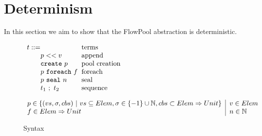 \section{Determinism}

In this section we aim to show that the FlowPool abstraction is deterministic.



\smallrulenames

\begin{figure}[t]


$\ba[t]{l@{\hspace{2mm}}l}
t    ::=                                                           & \mbox{terms}              \\
\gap p << v                                                  & \mbox{append}           \\
\gap \texttt{create}~p                                   & \mbox{pool creation}  \\
\gap p~\texttt{foreach}~f                             & \mbox{foreach}           \\
\gap p~\texttt{seal}~n                                  & \mbox{seal}                \\
\gap t_1~;~t_2                                               & \mbox{sequence}        \\
\ea$

$\ba{l@{\hspace{2mm}}|@{\hspace{2mm}}l@{\hspace{2mm}}l}
p \in \set{(vs, \sigma, cbs)~|~vs \subseteq Elem, \sigma \in \set{-1} \cup \mathbb{N}, cbs \subset Elem \Rightarrow Unit} & v \in Elem \\
f \in Elem \Rightarrow Unit & n \in \mathbb{N}
\ea$


\caption{Syntax}\label{fig:syntax}
\end{figure}

